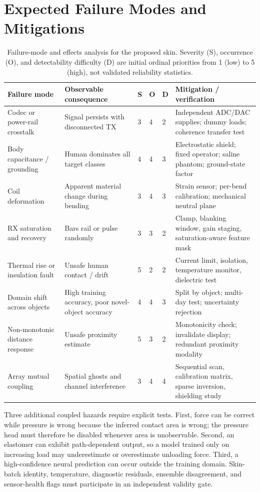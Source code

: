 \documentclass[10pt]{article}
\begin{document}
\section{Expected Failure Modes and Mitigations}
\begin{table}[t]
\centering\small
\caption{Failure-mode and effects analysis for the proposed skin. Severity (S), occurrence (O), and detectability difficulty (D) are initial ordinal priorities from 1 (low) to 5 (high), not validated reliability statistics.}
\label{tab:fmea}
\begin{tabularx}{\textwidth}{@{}X p{2.9cm}p{1.1cm}p{1.1cm}p{1.1cm}X@{}}
\toprule
Failure mode & Observable consequence & S & O & D & Mitigation / verification\\
\midrule
Codec or power-rail crosstalk & Signal persists with disconnected TX & 3 & 4 & 2 & Independent ADC/DAC supplies; dummy loads; coherence transfer test\\
Body capacitance / grounding & Human dominates all target classes & 4 & 4 & 3 & Electrostatic shield; fixed operator; saline phantom; ground-state factor\\
Coil deformation & Apparent material change during bending & 3 & 4 & 3 & Strain sensor; per-bend calibration; mechanical neutral plane\\
RX saturation and recovery & Bars rail or pulse randomly & 3 & 3 & 2 & Clamp, blanking window, gain staging, saturation-aware feature mask\\
Thermal rise or insulation fault & Unsafe human contact / drift & 5 & 2 & 2 & Current limit, isolation, temperature monitor, dielectric test\\
Domain shift across objects & High training accuracy, poor novel-object accuracy & 4 & 4 & 3 & Split by object; multi-day test; uncertainty rejection\\
Non-monotonic distance response & Unsafe proximity estimate & 5 & 3 & 2 & Monotonicity check; invalidate display; redundant proximity modality\\
Array mutual coupling & Spatial ghosts and channel interference & 3 & 4 & 4 & Sequential scan, calibration matrix, sparse inversion, shielding study\\
\bottomrule
\end{tabularx}
\end{table}

Three additional coupled hazards require explicit tests. First, force can be correct while pressure is wrong because the inferred contact area is wrong; the pressure head must therefore be disabled whenever area is unobservable. Second, an elastomer can exhibit path-dependent output, so a model trained only on increasing load may underestimate or overestimate unloading force. Third, a high-confidence neural prediction can occur outside the training domain. Skin-batch identity, temperature, diagnostic residuals, ensemble disagreement, and sensor-health flags must participate in an independent validity gate.
\end{document}

